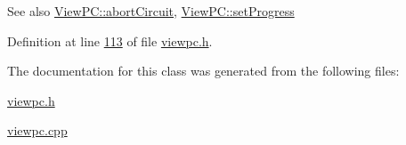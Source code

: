 \begin{DoxySeeAlso}{See also}
\hyperlink{class_view_p_c_ad7ba2fcf1d17862de15e32432823f7b0}{View\+P\+C\+::abort\+Circuit}, \hyperlink{class_view_p_c_a9c32a1fdb6ead84e5ada8fba8860c7ed}{View\+P\+C\+::set\+Progress} 
\end{DoxySeeAlso}


Definition at line \hyperlink{viewpc_8h_source_l00113}{113} of file \hyperlink{viewpc_8h_source}{viewpc.\+h}.



The documentation for this class was generated from the following files\+:\begin{DoxyCompactItemize}
\item 
\hyperlink{viewpc_8h}{viewpc.\+h}\item 
\hyperlink{viewpc_8cpp}{viewpc.\+cpp}\end{DoxyCompactItemize}
